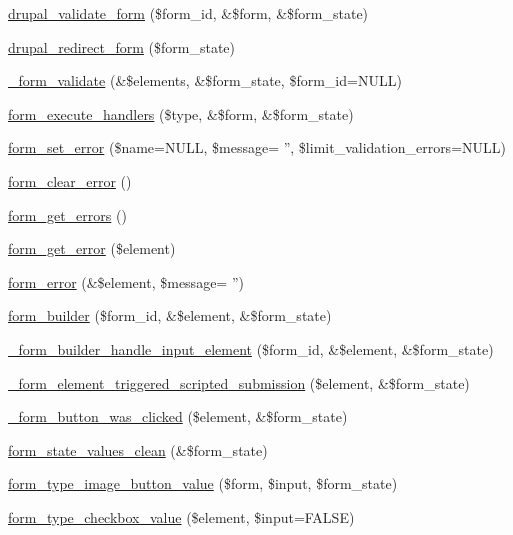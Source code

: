 \begin{DoxyCompactItemize}
\hyperlink{group__form__api_ga05a4aea7c6aa28db24a5f96da6948f34}{drupal\_\-validate\_\-form} (\$form\_\-id, \&\$form, \&\$form\_\-state)
\item 
\hyperlink{group__form__api_ga552fc91207f10c473d36bf3f9889506c}{drupal\_\-redirect\_\-form} (\$form\_\-state)
\item 
\hyperlink{group__form__api_ga464b4724506722d2a2d482df27736357}{\_\-form\_\-validate} (\&\$elements, \&\$form\_\-state, \$form\_\-id=NULL)
\item 
\hyperlink{group__form__api_ga9e32d49f4ca85da10a29dcfec27dd526}{form\_\-execute\_\-handlers} (\$type, \&\$form, \&\$form\_\-state)
\item 
\hyperlink{group__form__api_ga6f4ecbec42e905390e521b393417f97f}{form\_\-set\_\-error} (\$name=NULL, \$message= '', \$limit\_\-validation\_\-errors=NULL)
\item 
\hyperlink{group__form__api_ga0e498e7fdd19cabd0b76efbea3e36bba}{form\_\-clear\_\-error} ()
\item 
\hyperlink{group__form__api_ga158b3db5e88e96bf060c524cebcb8130}{form\_\-get\_\-errors} ()
\item 
\hyperlink{group__form__api_gae57581ad2406d61116a133b99142283b}{form\_\-get\_\-error} (\$element)
\item 
\hyperlink{group__form__api_ga0e6b470194005ad3ff2fbf45f671dfa9}{form\_\-error} (\&\$element, \$message= '')
\item 
\hyperlink{group__form__api_gae839323ba1c81ba86030b496fee24f7d}{form\_\-builder} (\$form\_\-id, \&\$element, \&\$form\_\-state)
\item 
\hyperlink{group__form__api_ga908b7f94c6c9a0ef07a62466c6c196d7}{\_\-form\_\-builder\_\-handle\_\-input\_\-element} (\$form\_\-id, \&\$element, \&\$form\_\-state)
\item 
\hyperlink{group__form__api_ga8ce84d64b9ae0576619ec4399cee2b35}{\_\-form\_\-element\_\-triggered\_\-scripted\_\-submission} (\$element, \&\$form\_\-state)
\item 
\hyperlink{group__form__api_ga3f83a917fae34f718032f4a104bc6b36}{\_\-form\_\-button\_\-was\_\-clicked} (\$element, \&\$form\_\-state)
\item 
\hyperlink{group__form__api_ga012a73101cc9e2bfbb9e9a41c4e0a723}{form\_\-state\_\-values\_\-clean} (\&\$form\_\-state)
\item 
\hyperlink{group__form__api_ga504ddd599ddb4a4992638ec6afb7cd40}{form\_\-type\_\-image\_\-button\_\-value} (\$form, \$input, \$form\_\-state)
\item 
\hyperlink{group__form__api_gae6014b94202e1d6e5c55421fc5b7d368}{form\_\-type\_\-checkbox\_\-value} (\$element, \$input=FALSE)

\end{DoxyCompactItemize}
